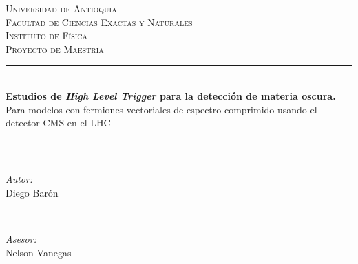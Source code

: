 \begin{titlepage}

\newcommand{\HRule}{\rule{\linewidth}{0.5mm}} %

\center %
 

\textsc{\LARGE Universidad de Antioquia}\\[1.5cm] %
\textsc{\Large Facultad de Ciencias Exactas y Naturales}\\[0.5cm]
\textsc{\Large Instituto de Física}\\[0.5cm]
\textsc{\large Proyecto de Maestría}\\[0.5cm] %


\HRule \\[0.3cm]
{ \huge \bfseries Estudios de \textit{High Level Trigger} para la detección de materia oscura. }\\\LARGE{Para modelos con fermiones vectoriales de espectro  comprimido usando el detector CMS en el LHC}\\[0.4cm] %
\HRule \\[0.6cm]
 

\begin{minipage}{0.4\textwidth}
\begin{flushleft} \large
\emph{Autor:}\\
Diego Barón \textsc{} %
\end{flushleft}
\end{minipage}
~
\begin{minipage}{0.4\textwidth}
\begin{flushright} \large
\emph{Asesor:} \\
Nelson Vanegas \textsc{} %
\end{flushright}
\end{minipage}\\[0.7cm]


\end{titlepage}
